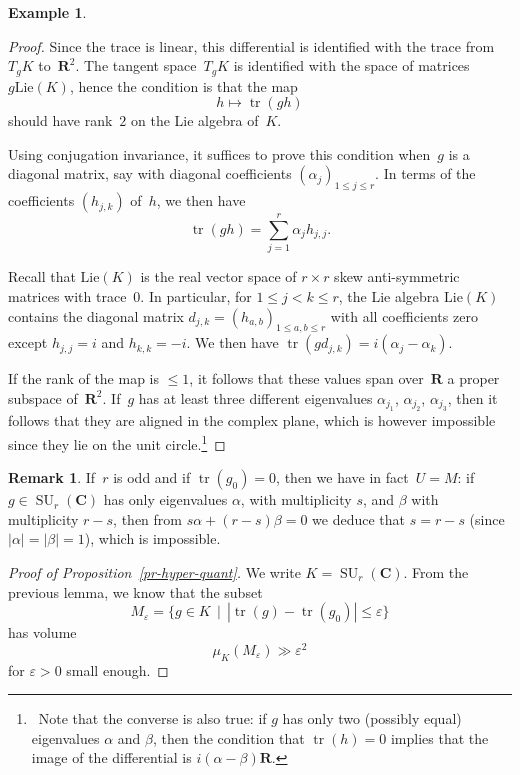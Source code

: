 \documentclass[12pt]{amsart}
\renewcommand{\leq}{\leqslant}
\newcommand{\Cc}{\mathbf{C}}
\newcommand{\Rr}{\mathbf{R}}
\DeclareMathOperator{\Tr}{tr}
\newcommand{\eps}{\varepsilon}
\DeclareMathOperator{\SU}{SU}
\theoremstyle{plain}
\theoremstyle{remark}
\theoremstyle{definition}
\newtheorem{example}[theorem]{Example}
\newtheorem{remark}[theorem]{Remark}
\renewcommand{\leq}{\leqslant}
\begin{document}
\begin{example}
\begin{proof}
    Since the trace is linear, this differential is
    identified with the trace from $T_gK$ to~$\Rr^2$.  The tangent
    space~$T_gK$ is identified with the space of matrices
    $g\mathrm{Lie}(K)$, hence the condition is that the map
    \[
      h\mapsto \Tr(gh)
    \]
    should have rank~$2$ on the Lie algebra of~$K$.

    Using conjugation invariance, it suffices to prove this condition
    when~$g$ is a diagonal matrix, say with diagonal coefficients
    $(\alpha_j)_{1\leq j\leq r}$.  In terms of the coefficients
    $(h_{j,k})$ of~$h$, we then have
    \[
      \Tr(gh)=\sum_{j=1}^r\alpha_j h_{j,j}.
    \]

    Recall that $\mathrm{Lie}(K)$ is the real vector space of
    $r\times r$ skew anti-symmetric matrices with trace~$0$. In
    particular, for $1\leq j<k\leq r$, the Lie algebra
    $\mathrm{Lie}(K)$ contains the diagonal matrix
    $d_{j,k} = (h_{a,b})_{1 \leq a,b \leq r}$ with all coefficients
    zero except $h_{j,j}=i$ and $h_{k,k}=-i$. We then have
    $\Tr(gd_{j,k})=i(\alpha_j-\alpha_k)$.

    If the rank of the map is $\leq 1$, it follows that these values
    span over~$\Rr$ a proper subspace of~$\Rr^2$. If~$g$ has at least
    three different eigenvalues $\alpha_{j_1}$, $\alpha_{j_2}$,
    $\alpha_{j_3}$, then it follows that they are aligned in the
    complex plane, which is however impossible since they lie on the
    unit circle.\footnote{\ Note that the converse is also true: if
      $g$ has only two (possibly equal) eigenvalues $\alpha$ and
      $\beta$, then the condition that $\Tr(h)=0$ implies that the
      image of the differential is $i(\alpha-\beta)\Rr$.}
  \end{proof}

  \begin{remark}
    If~$r$ is odd and if $\Tr(g_0)=0$, then we have in fact~$U=M$: if
    $g\in\SU_r(\Cc)$ has only eigenvalues $\alpha$, with multiplicity
    $s$, and $\beta$ with multiplicity $r-s$, then from
    $s\alpha+(r-s)\beta=0$ we deduce that $s=r-s$ (since
    $|\alpha|=|\beta|=1$), which is impossible.
  \end{remark}
  
  \begin{proof}[Proof of Proposition~\ref{pr-hyper-quant}]
    We write $K=\SU_r(\Cc)$.  From the previous lemma, we know that the
    subset
    \[
      M_{\eps}=\{g\in K\,\mid\, |\Tr(g)-\Tr(g_0)|\leq \eps\}
    \]
    has volume
    \[
      \mu_K(M_{\eps})\gg \eps^2
    \]
    for $\eps>0$ small enough.
    

\end{proof}
\end{example}
\end{document}
